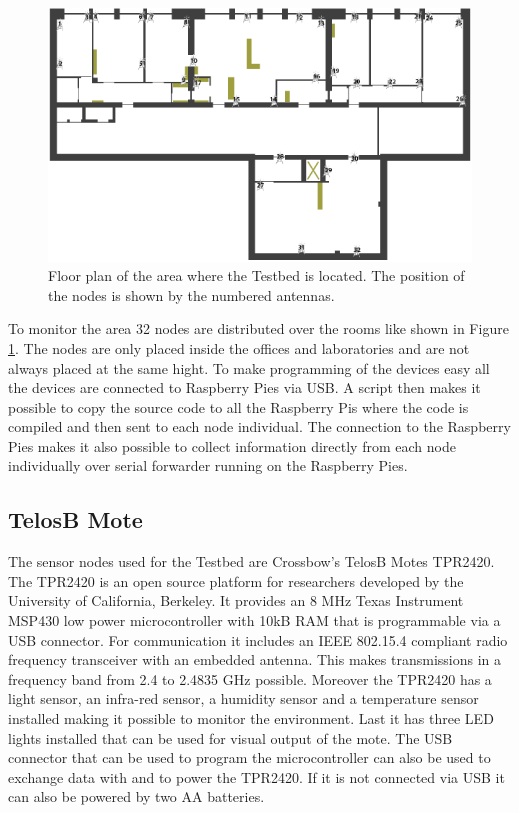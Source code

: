 \begin{figure}[htbp]
	\centering
    \includegraphics[scale=0.75]{content/images/Testbed}
   	\caption{Floor plan of the area where the Testbed is located. The position of the nodes is shown by the numbered antennas.}
    \label{fig:testbed}
\end{figure}

To monitor the area 32 nodes are distributed over the rooms like shown in Figure \ref{fig:testbed}. The nodes are only placed inside the offices and laboratories and are not always placed at the same hight. To make programming of the devices easy all the devices are connected to Raspberry Pies via USB. A script then makes it possible to copy the source code to all the Raspberry Pis where the code is compiled and then sent to each node individual. The connection to the Raspberry Pies makes it also possible to collect information directly from each node individually over serial forwarder running on the Raspberry Pies.

\subsection{TelosB Mote}
The sensor nodes used for the Testbed are Crossbow's TelosB Motes TPR2420. The TPR2420 is an open source platform for researchers developed by the University of California, Berkeley. It provides an 8 MHz Texas Instrument MSP430 low power microcontroller with 10kB RAM that is programmable via a USB connector. For communication it includes an IEEE 802.15.4 compliant radio frequency transceiver with an embedded antenna. This makes transmissions in a frequency band from 2.4 to 2.4835 GHz possible. Moreover the TPR2420 has a light sensor, an infra-red sensor, a humidity sensor and a temperature sensor installed making it possible to monitor the environment. Last it has three LED lights installed that can be used for visual output of the mote. The USB connector that can be used to program the microcontroller can also be used to exchange data with and to power the TPR2420. If it is not connected via USB it can also be powered by two AA batteries. \cite{telosb}

